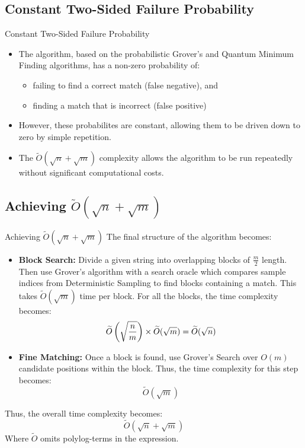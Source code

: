 \documentclass{beamer}
\begin{document}
\subsection{Constant Two-Sided Failure Probability}
\begin{frame}{Constant Two-Sided Failure Probability}
  \begin{itemize}
    \item The algorithm, based on the probabilistic Grover's and Quantum Minimum Finding algorithms, has a non-zero probability of:
          \begin{itemize}
            \item failing to find a correct match (false negative), and
            \item finding a match that is incorrect (false positive)
          \end{itemize}

    \item However, these probabilites are constant, allowing them to be driven down to zero by simple repetition.
    \item The $\widetilde{O} (\sqrt{n} + \sqrt{m})$ complexity allows the algorithm to be run repeatedly without significant computational costs.
  \end{itemize}
\end{frame}

\subsection{Achieving \texorpdfstring{$\widetilde{O}(\sqrt{n} + \sqrt{m})$}{O(sqrt(n)+sqrt(m))}}
\begin{frame}{Achieving \texorpdfstring{$\widetilde{O}(\sqrt{n} + \sqrt{m})$}{O(sqrt(n)+sqrt(m))}}
  The final structure of the algorithm becomes:
  \begin{itemize}
    \item \textbf{Block Search: }Divide a given string into overlapping blocks of $\frac{m}{2}$ length. Then use Grover's algorithm with a search oracle which compares sample indices from Deterministic Sampling to find blocks containing a match. This takes $\widetilde{O}(\sqrt{m})$ time per block. For all the blocks, the time complexity becomes:
          \[
            \widetilde{O} \left(\sqrt{n \over m}\right) \times \widetilde{O}(\sqrt{m}) = \widetilde{O}(\sqrt{n})
          \]
    \item \textbf{Fine Matching: }Once a block is found, use Grover's Search over $O(m)$ candidate positions within the block. Thus, the time complexity for this step becomes:
          \[
            \widetilde{O}(\sqrt{m})
          \]
  \end{itemize}
  Thus, the overall time complexity becomes:
  \[
    \widetilde{O}(\sqrt{n}+\sqrt{m})
  \]
  Where $\widetilde{O}$ omits polylog-terms in the expression.
\end{frame}
\end{document}
